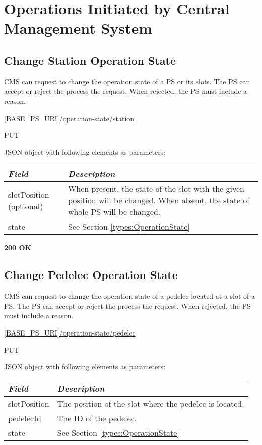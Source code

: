 \section{Operations Initiated by Central Management System}

\subsection{Change Station Operation State}

\acs{CMS} can request to change the operation state of a \acs{PS} or its slots. The \acs{PS} can accept or reject the process the request. When rejected, the \acs{PS} must include a reason.

 \url{[BASE_PS_URI]/operation-state/station}

 PUT

JSON object with following elements as parameters:\\
\begin{tabularx}{\linewidth}{ | l | X | }
  \hline
  \textit{Field} & \textit{Description} \\
  \hline \hline
  slotPosition (optional) 		& When present, the state of the slot with the given position will be changed. When absent, the state of whole \acs{PS} will be changed. \\
  state 					& See Section \ref{types:OperationState} \\
    \hline
\end{tabularx}

 \textbf{200 OK}


\subsection{Change Pedelec Operation State}

\acs{CMS} can request to change the operation state of a pedelec located at a slot of a \acs{PS}. The \acs{PS} can accept or reject the process the request. When rejected, the \acs{PS} must include a reason.

 \url{[BASE_PS_URI]/operation-state/pedelec}

 PUT

JSON object with following elements as parameters:\\
\begin{tabularx}{\linewidth}{ | l | X | }
  \hline
  \textit{Field} & \textit{Description} \\
  \hline \hline
  slotPosition	& The position of the slot where the pedelec is located. \\
  pedelecId		& The ID of the pedelec. \\
  state 			& See Section \ref{types:OperationState} \\
  \hline
\end{tabularx}

